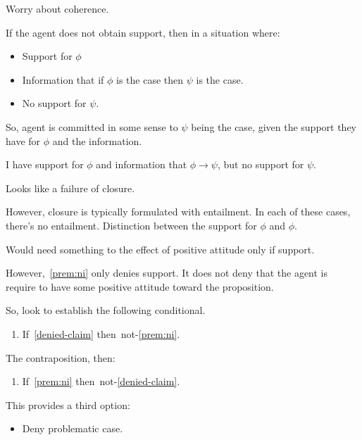 \documentclass[10pt]{article}
\begin{document}
\begin{note}
  Worry about coherence.

  If the agent does not obtain support, then in a situation where:
  \begin{itemize}
  \item Support for \(\phi\)
  \item Information that if \(\phi\) is the case then \(\psi\) is the case.
  \item No support for \(\psi\).
  \end{itemize}

  So, agent is committed in some sense to \(\psi\) being the case, given the support they have for \(\phi\) and the information.

  I have support for \(\phi\) and information that \(\phi \rightarrow \psi\), but no support for \(\psi\).

  Looks like a failure of closure.

  However, closure is typically formulated with entailment.
  In each of these cases, there's no entailment.
  Distinction between the support for \(\phi\) and \(\phi\).

  Would need something to the effect of positive attitude only if support.
  

  However,~\ref{prem:ni} only denies support.
  It does not deny that the agent is require to have some positive attitude toward the proposition.

  
\end{note}






So, look to establish the following conditional.

\begin{enumerate}
\item\label{goal:cond} If~\ref{denied-claim} then~not-\ref{prem:ni}.
\end{enumerate}

The contraposition, then:

\begin{enumerate}
\item\label{goal:cond:var} If~\ref{prem:ni} then~not-\ref{denied-claim}.
\end{enumerate}

This provides a third option:
\begin{itemize}
\item Deny problematic case.
\end{itemize}
\end{document}
